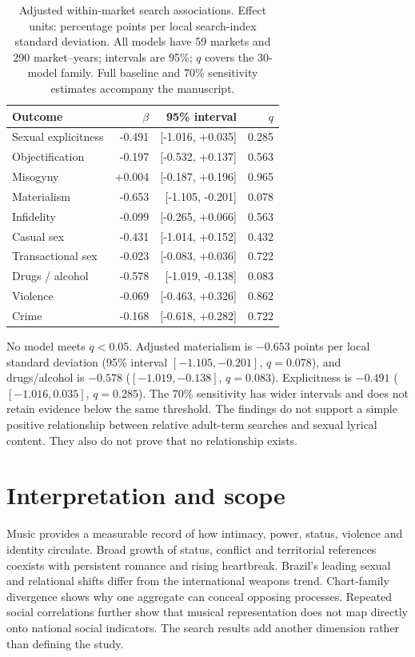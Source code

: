 \documentclass[10pt,a4paper,twocolumn]{article}
\begin{document}
\begin{table}[t]
\caption{Adjusted within-market search associations. Effect units: percentage points per local search-index standard deviation. All models have 59 markets and 290 market--years; intervals are 95\%; $q$ covers the 30-model family. Full baseline and 70\% sensitivity estimates accompany the manuscript.}
\label{tab:models}
\centering\scriptsize\setlength{\tabcolsep}{3pt}
\begin{tabularx}{\columnwidth}{@{}Xrrr@{}}
\toprule Outcome & $\beta$ & 95\% interval & $q$ \\
\midrule
Sexual explicitness & -0.491 & [-1.016, +0.035] & 0.285 \\
Objectification & -0.197 & [-0.532, +0.137] & 0.563 \\
Misogyny & +0.004 & [-0.187, +0.196] & 0.965 \\
Materialism & -0.653 & [-1.105, -0.201] & 0.078 \\
Infidelity & -0.099 & [-0.265, +0.066] & 0.563 \\
Casual sex & -0.431 & [-1.014, +0.152] & 0.432 \\
Transactional sex & -0.023 & [-0.083, +0.036] & 0.722 \\
Drugs / alcohol & -0.578 & [-1.019, -0.138] & 0.083 \\
Violence & -0.069 & [-0.463, +0.326] & 0.862 \\
Crime & -0.168 & [-0.618, +0.282] & 0.722 \\
\bottomrule
\end{tabularx}
\end{table}

No model meets $q<0.05$. Adjusted materialism is $-0.653$ points per local standard deviation (95\% interval $[-1.105,-0.201]$, $q=0.078$), and drugs/alcohol is $-0.578$ ($[-1.019,-0.138]$, $q=0.083$). Explicitness is $-0.491$ ($[-1.016,0.035]$, $q=0.285$). The 70\% sensitivity has wider intervals and does not retain evidence below the same threshold. The findings do not support a simple positive relationship between relative adult-term searches and sexual lyrical content. They also do not prove that no relationship exists.

\balance
\section{Interpretation and scope}
Music provides a measurable record of how intimacy, power, status, violence and identity circulate. Broad growth of status, conflict and territorial references coexists with persistent romance and rising heartbreak. Brazil's leading sexual and relational shifts differ from the international weapons trend. Chart-family divergence shows why one aggregate can conceal opposing processes. Repeated social correlations further show that musical representation does not map directly onto national social indicators. The search results add another dimension rather than defining the study.
\end{document}
